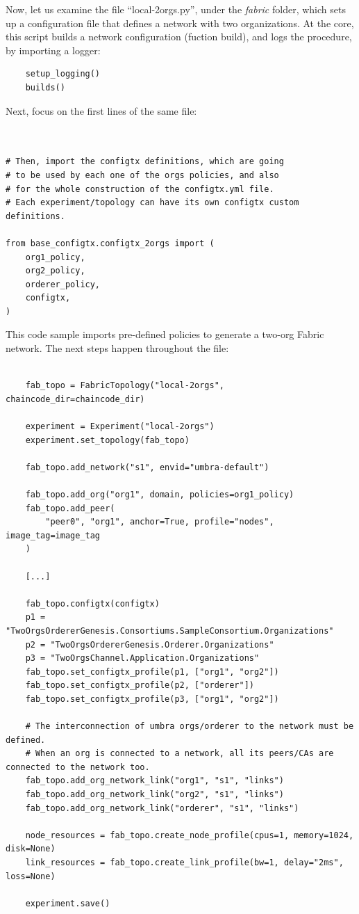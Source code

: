 \documentclass[12pt,a4paper]{article}
\theoremstyle{definition}
\begin{document}
Now, let us examine the file ``local-2orgs.py'', under the \emph{fabric} folder, which sets up a configuration file that defines a network with two organizations. At the core, this script builds a network configuration (fuction build), and logs the procedure, by importing a logger:

\begin{verbatim}
    setup_logging()
    builds()
\end{verbatim}

Next, focus on the first lines of the same file:

\begin{verbatim}


# Then, import the configtx definitions, which are going
# to be used by each one of the orgs policies, and also
# for the whole construction of the configtx.yml file.
# Each experiment/topology can have its own configtx custom definitions.

from base_configtx.configtx_2orgs import (
    org1_policy,
    org2_policy,
    orderer_policy,
    configtx,
)
\end{verbatim}

This code sample imports pre-defined policies to generate a two-org Fabric network. The next steps happen throughout the file: 


\begin{verbatim}

    fab_topo = FabricTopology("local-2orgs", chaincode_dir=chaincode_dir)
    
    experiment = Experiment("local-2orgs")
    experiment.set_topology(fab_topo)
    
    fab_topo.add_network("s1", envid="umbra-default")

    fab_topo.add_org("org1", domain, policies=org1_policy)
    fab_topo.add_peer(
        "peer0", "org1", anchor=True, profile="nodes", image_tag=image_tag
    )
    
    [...]
    
    fab_topo.configtx(configtx)
    p1 = "TwoOrgsOrdererGenesis.Consortiums.SampleConsortium.Organizations"
    p2 = "TwoOrgsOrdererGenesis.Orderer.Organizations"
    p3 = "TwoOrgsChannel.Application.Organizations"
    fab_topo.set_configtx_profile(p1, ["org1", "org2"])
    fab_topo.set_configtx_profile(p2, ["orderer"])
    fab_topo.set_configtx_profile(p3, ["org1", "org2"])
    
    # The interconnection of umbra orgs/orderer to the network must be defined.
    # When an org is connected to a network, all its peers/CAs are connected to the network too.
    fab_topo.add_org_network_link("org1", "s1", "links")
    fab_topo.add_org_network_link("org2", "s1", "links")
    fab_topo.add_org_network_link("orderer", "s1", "links")
    
    node_resources = fab_topo.create_node_profile(cpus=1, memory=1024, disk=None)
    link_resources = fab_topo.create_link_profile(bw=1, delay="2ms", loss=None)
    
    experiment.save()

    
\end{verbatim}
\end{document}
